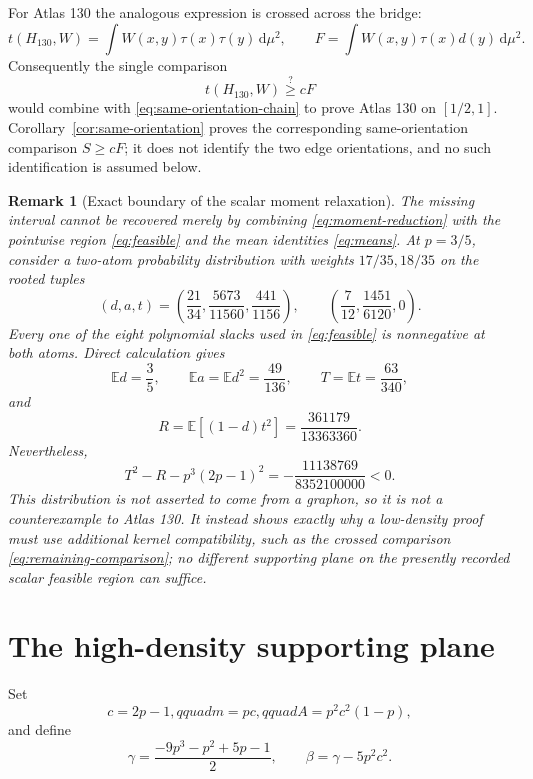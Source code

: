 \documentclass[11pt]{article}
\newtheorem{remark}[theorem]{Remark}
\newcommand{\dd}{\,\mathrm d}
\begin{document}
For Atlas 130 the analogous expression is crossed across the bridge:
\[
 t(H_{130},W)=\int W(x,y)\tau(x)\tau(y)\dd\mu^2,
 \qquad
 F=\int W(x,y)\tau(x)d(y)\dd\mu^2.
\]
Consequently the single comparison
\begin{equation}
 t(H_{130},W)\stackrel{?}{\geq}cF
 \label{eq:remaining-comparison}
\end{equation}
would combine with \eqref{eq:same-orientation-chain} to prove Atlas 130 on
$[1/2,1]$.  Corollary~\ref{cor:same-orientation} proves the corresponding
same-orientation comparison $S\geq cF$; it does not identify the two edge
orientations, and no such identification is assumed below.

\begin{remark}[Exact boundary of the scalar moment relaxation]
\label{rem:low-scalar-obstruction}
The missing interval cannot be recovered merely by combining
\eqref{eq:moment-reduction} with the pointwise region
\eqref{eq:feasible} and the mean identities \eqref{eq:means}.  At
$p=3/5$, consider a two-atom probability distribution with weights
$17/35,18/35$ on the rooted tuples
\[
 (d,a,t)=
 \left(\frac{21}{34},\frac{5673}{11560},\frac{441}{1156}\right),
 \qquad
 \left(\frac7{12},\frac{1451}{6120},0\right).
\]
Every one of the eight polynomial slacks used in
\eqref{eq:feasible} is nonnegative at both atoms.  Direct calculation gives
\[
 \mathbb E d=\frac35,
 \qquad
 \mathbb E a=\mathbb E d^2=\frac{49}{136},
 \qquad
 T=\mathbb E t=\frac{63}{340},
\]
and
\[
 R=\mathbb E[(1-d)t^2]=\frac{361179}{13363360}.
\]
Nevertheless,
\[
 T^2-R-p^3(2p-1)^2
 =-\frac{11138769}{8352100000}<0.
\]
This distribution is not asserted to come from a graphon, so it is not a
counterexample to Atlas 130.  It instead shows exactly why a low-density
proof must use additional kernel compatibility, such as the crossed
comparison \eqref{eq:remaining-comparison}; no different supporting plane
on the presently recorded scalar feasible region can suffice.
\end{remark}

\section{The high-density supporting plane}

Set
\begin{equation}
 c=2p-1,qquad m=pc,qquad A=p^2c^2(1-p),
 \label{eq:coefficients1}
\end{equation}
and define
\begin{equation}
 \gamma=\frac{-9p^3-p^2+5p-1}{2},
 \qquad
 \beta=\gamma-5p^2c^2.
 \label{eq:coefficients2}
\end{equation}
\end{document}
